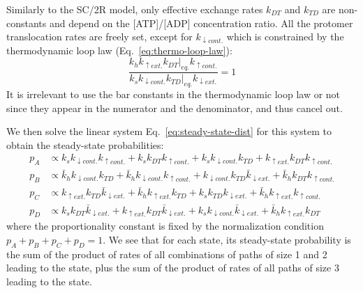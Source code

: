     Similarly to the SC/2R model, only effective exchange rates $k_{DT}$ and $k_{TD}$ are non-constants and depend on the [ATP]/[ADP] concentration ratio. All the protomer translocation rates are freely set, except for $k_{\downarrow cont.}$ which is constrained by the thermodynamic loop law (Eq.~\eqref{eq:thermo-loop-law}):
    \begin{equation}
    \label{eq:rpcl-thermo-loop-law}
        \frac{k_h k_{\uparrow ext.} \left.k_{DT}\right|_{eq.} k_{\uparrow cont.}}{k_s k_{\downarrow cont.} \left.k_{TD}\right|_{eq.} k_{\downarrow ext.}} = 1
    \end{equation}
    It is irrelevant to use the bar constants in the thermodynamic loop law or not since they appear in the numerator and the denominator, and thus cancel out.
    
    We then solve the linear system Eq.~\eqref{eq:steady-state-dist} for this system to obtain the steady-state probabilities:
    \begin{equation}
    \label{eq:rpcl-steady-state-probabilities}
    \begin{split}
        p_A &\propto k_s k_{\downarrow cont.} k_{\uparrow cont.} + k_s k_{DT} k_{\uparrow cont.} + k_s k_{\downarrow cont.} k_{TD} + k_{\uparrow ext.} k_{DT} k_{\uparrow cont.} \\
        p_B &\propto \bar{k}_h k_{\downarrow cont.} k_{TD} + \bar{k}_h k_{\downarrow cont.} k_{\uparrow cont.} + k_{\downarrow cont.} k_{TD} \bar{k}_{\downarrow ext.} + \bar{k}_h k_{DT} k_{\uparrow cont.} \\
        p_C &\propto k_{\uparrow ext.} k_{TD} \bar{k}_{\downarrow ext.} + \bar{k}_h k_{\uparrow ext.} k_{TD} + k_s k_{TD} k_{\downarrow ext.} + \bar{k}_h k_{\uparrow ext.} k_{\uparrow cont.} \\
        p_D &\propto k_s k_{DT} \bar{k}_{\downarrow ext.} + k_{\uparrow ext.} k_{DT} \bar{k}_{\downarrow ext.} + k_s k_{\downarrow cont.} \bar{k}_{\downarrow ext.} + \bar{k}_h k_{\uparrow ext.} k_{DT}
    \end{split}
    \end{equation}
    where the proportionality constant is fixed by the normalization condition $p_A+p_B+p_C+p_D=1$. We see that for each state, its steady-state probability is the sum of the product of rates of all combinations of paths of size 1 and 2 leading to the state, plus the sum of the product of rates of all paths of size 3 leading to the state.
    
